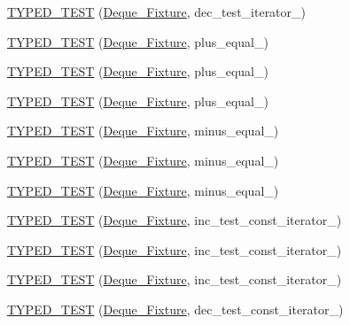 \begin{DoxyCompactItemize}
\item 
\hyperlink{TestDeque_8c_09_09_ad7ff570134f28345b6e5014c42e2289b}{T\-Y\-P\-E\-D\-\_\-\-T\-E\-S\-T} (\hyperlink{structDeque__Fixture}{Deque\-\_\-\-Fixture}, dec\-\_\-test\-\_\-iterator\-\_)
\item 
\hyperlink{TestDeque_8c_09_09_ab5366bd0412588be304c640551cbc2d6}{T\-Y\-P\-E\-D\-\_\-\-T\-E\-S\-T} (\hyperlink{structDeque__Fixture}{Deque\-\_\-\-Fixture}, plus\-\_\-equal\-\_)
\item 
\hyperlink{TestDeque_8c_09_09_ab0935d9b78b4aa03bd5da24d70dc4e48}{T\-Y\-P\-E\-D\-\_\-\-T\-E\-S\-T} (\hyperlink{structDeque__Fixture}{Deque\-\_\-\-Fixture}, plus\-\_\-equal\-\_)
\item 
\hyperlink{TestDeque_8c_09_09_a1d1bb53710df471125536d99d5465853}{T\-Y\-P\-E\-D\-\_\-\-T\-E\-S\-T} (\hyperlink{structDeque__Fixture}{Deque\-\_\-\-Fixture}, plus\-\_\-equal\-\_)
\item 
\hyperlink{TestDeque_8c_09_09_a65fbb7b9c47ce6ee678fa81a97c16f06}{T\-Y\-P\-E\-D\-\_\-\-T\-E\-S\-T} (\hyperlink{structDeque__Fixture}{Deque\-\_\-\-Fixture}, minus\-\_\-equal\-\_)
\item 
\hyperlink{TestDeque_8c_09_09_a063ec813b1bae74d7a6a1092a8957be8}{T\-Y\-P\-E\-D\-\_\-\-T\-E\-S\-T} (\hyperlink{structDeque__Fixture}{Deque\-\_\-\-Fixture}, minus\-\_\-equal\-\_)
\item 
\hyperlink{TestDeque_8c_09_09_a8d0974a3715ce0afd06a5fd9eae85209}{T\-Y\-P\-E\-D\-\_\-\-T\-E\-S\-T} (\hyperlink{structDeque__Fixture}{Deque\-\_\-\-Fixture}, minus\-\_\-equal\-\_)
\item 
\hyperlink{TestDeque_8c_09_09_a6ba613c7a563f0284a5c3028f92d014d}{T\-Y\-P\-E\-D\-\_\-\-T\-E\-S\-T} (\hyperlink{structDeque__Fixture}{Deque\-\_\-\-Fixture}, inc\-\_\-test\-\_\-const\-\_\-iterator\-\_)
\item 
\hyperlink{TestDeque_8c_09_09_a6c9e5b621116aa955e99e10f2514dd17}{T\-Y\-P\-E\-D\-\_\-\-T\-E\-S\-T} (\hyperlink{structDeque__Fixture}{Deque\-\_\-\-Fixture}, inc\-\_\-test\-\_\-const\-\_\-iterator\-\_)
\item 
\hyperlink{TestDeque_8c_09_09_aab01341c67e34fdf9f52bafedd507fd4}{T\-Y\-P\-E\-D\-\_\-\-T\-E\-S\-T} (\hyperlink{structDeque__Fixture}{Deque\-\_\-\-Fixture}, inc\-\_\-test\-\_\-const\-\_\-iterator\-\_)
\item 
\hyperlink{TestDeque_8c_09_09_a30f673b5afb71d4a3cd73ae221b1c74a}{T\-Y\-P\-E\-D\-\_\-\-T\-E\-S\-T} (\hyperlink{structDeque__Fixture}{Deque\-\_\-\-Fixture}, dec\-\_\-test\-\_\-const\-\_\-iterator\-\_)
\item 

\end{DoxyCompactItemize}
